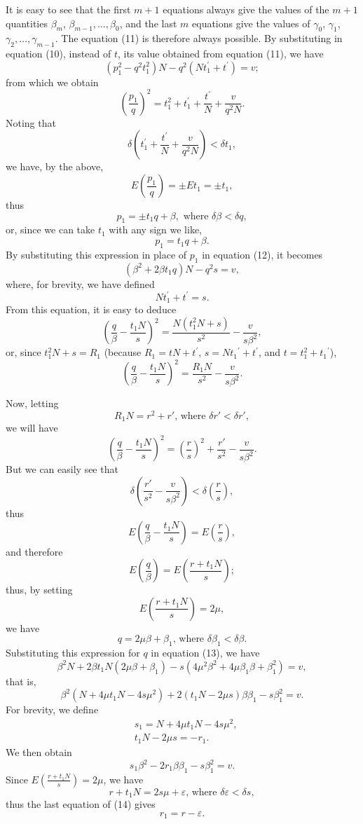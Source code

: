 \documentclass[oneside, 12 pt, leqno]{memoir}
\begin{document}
It is easy to see that the first \(m+1\) equations always give the values of the \(m+1\) quantities \(\beta_m\), \(\beta_{m-1},\dots,\beta_0\), and the last \(m\) equations give the values of \(\gamma_0\), \(\gamma_1\), \(\gamma_2,\dots,\gamma_{m-1}\). The equation (11) is therefore always possible.
%
By substituting in equation (10), instead of \(t\), its value obtained from equation (11), we have
\[\tag{12}\left(p_1^2-q^2 t_1^2\right) N-q^2\left(N t_1^{\prime}+t^{\prime}\right)=v;\]
from which we obtain
\[\left(\frac{p_1}{q}\right)^2=t_1^2+t_1^{\prime}+\frac{t^{\prime}}{N}+\frac{v}{q^2 N}.\]
Noting that
\[\delta\left(t_1^{\prime}+\frac{t^{\prime}}{N}+\frac{v}{q^2 N}\right)<\delta t_1,\]
we have, by the above,
\[E\left(\frac{p_1}{q}\right)= \pm E t_1= \pm t_1,\]
thus
\[p_1= \pm t_1 q+\beta, \text { where } \delta \beta<\delta q,\]
or, since we can take \(t_1\) with any sign we like,
\[p_1=t_1 q+\beta.\]
By substituting this expression in place of \(p_1\) in equation (12), it becomes
\[\tag{13}\left(\beta^2+2 \beta t_1 q\right) N-q^2 s=v,\]
where, for brevity, we have defined
\[N t_1^{\prime}+t^{\prime}=s.\]
From this equation, it is easy to deduce
\[\left(\frac{q}{\beta}-\frac{t_1 N}{s}\right)^2=\frac{N\left(t_1^2 N+s\right)}{s^2}-\frac{v}{s \beta^2},\]
or, since \(t_1^2 N+s=R_1\) (because \(R_1=t N+t^{\prime}\), \(s=N {t_1}^{\prime}+t^{\prime}\), and \(t=t_1^2+{t_1}^{\prime}\)),
\[\left(\frac{q}{\beta}-\frac{t_1 N}{s}\right)^2=\frac{R_1 N}{s^2}-\frac{v}{s \beta^2}.\]

Now, letting
\[R_1 N=r^2+r' \text {, where } \delta r'<\delta r',\]
we will have
\[\left(\frac{q}{\beta}-\frac{t_1 N}{s}\right)^2=\left(\frac{r}{s}\right)^2+\frac{r'}{s^2}-\frac{v}{s \beta^2}.\]
But we can easily see that
\[\delta\left(\frac{r'}{s^2}-\frac{v}{s \beta^2}\right)<\delta\left(\frac{r}{s}\right),\]
thus
\[E\left(\frac{q}{\beta}-\frac{t_1 N}{s}\right)=E\left(\frac{r}{s}\right),\]
and therefore
\[E\left(\frac{q}{\beta}\right)=E\left(\frac{r+t_1 N}{s}\right);\]
thus, by setting
\[E\left(\frac{r+t_1 N}{s}\right)=2 \mu,\]
we have
\[q=2 \mu \beta+\beta_1 \text {, where } \delta \beta_1<\delta \beta.\]
Substituting this expression for \(q\) in equation (13), we have
\[\beta^2 N+2 \beta t_1 N\left(2 \mu \beta+\beta_1\right)-s\left(4 \mu^2 \beta^2+4 \mu \beta_1 \beta+\beta_1^2\right)=v,\]
that is,
\[\beta^2\left(N+4 \mu t_1 N-4 s \mu^2\right)+2\left(t_1 N-2 \mu s\right) \beta \beta_1-s \beta_1^2=v.\]
For brevity, we define
\[\tag{14}\begin{aligned}
& s_1=N+4 \mu t_1 N-4 s \mu^2, \\
& t_1 N-2 \mu s=-r_1.
\end{aligned}\]
We then obtain
\[\tag{15}s_1 \beta^2-2 r_1 \beta \beta_1-s \beta_1^2=v.\]
Since \(E\left(\frac{r+t_1 N}{s}\right)=2 \mu\), we have
\[r+t_1 N=2 s \mu+\varepsilon \text {, where } \delta \varepsilon<\delta s,\]
thus the last equation of (14) gives
\[r_1=r-\varepsilon.\]
\end{document}
